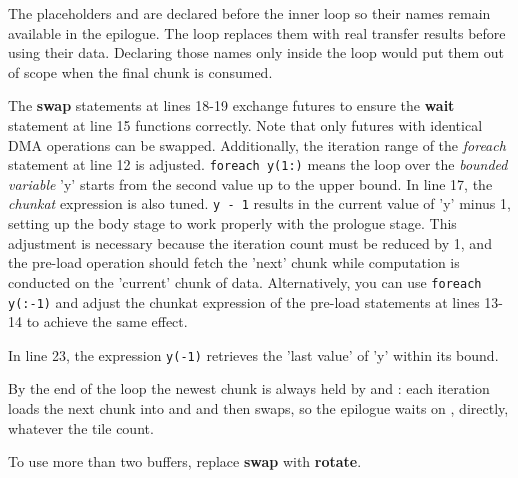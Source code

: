 The placeholders \co@lfB@ and \co@rfB@ are declared before the inner loop so their names remain available in the epilogue. The loop replaces them with real transfer results before using their data. Declaring those names only inside the loop would put them out of scope when the final chunk is consumed.

The \textbf{swap} statements at lines 18-19 exchange futures to ensure the \textbf{wait} statement at line 15 functions correctly. Note that only futures with identical DMA operations can be swapped. Additionally, the iteration range of the \emph{foreach} statement at line 12 is adjusted. \texttt{foreach y(1:)} means the loop over the \emph{bounded variable} 'y' starts from the second value up to the upper bound. In line 17, the \emph{chunkat} expression is also tuned. \texttt{y - 1} results in the current value of 'y' minus 1, setting up the body stage to work properly with the prologue stage. This adjustment is necessary because the iteration count must be reduced by 1, and the pre-load operation should fetch the 'next' chunk while computation is conducted on the 'current' chunk of data. Alternatively, you can use \texttt{foreach y(:-1)} and adjust the chunkat expression of the pre-load statements at lines 13-14 to achieve the same effect.

In line 23, the expression \texttt{y(-1)} retrieves the 'last value' of 'y' within its bound.

By the end of the loop the newest chunk is always held by \co@lfA@ and \co@rfA@: each iteration loads the next chunk into \co@lfB@ and \co@rfB@ and then swaps, so the epilogue waits on \co@lfA@, \co@rfA@ directly, whatever the tile count.

To use more than two buffers, replace \textbf{swap} with \textbf{rotate}.
